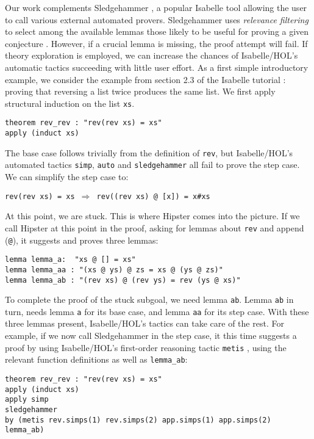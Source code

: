 Our work complements Sledgehammer \cite{sledgehammer}, a popular Isabelle tool allowing the user to call various external automated provers. Sledgehammer uses \emph{relevance filtering} to select among the available lemmas those likely to be useful for proving a given conjecture \cite{mash}. However, if a crucial lemma is missing, the proof attempt will fail. If theory exploration is employed, we can increase the chances of Isabelle/HOL's automatic tactics succeeding with little user effort. As a first simple introductory example, we consider the example from section 2.3 of the Isabelle tutorial \cite{isabelle}: proving that reversing a list twice produces the same list. We first apply structural induction on the list \texttt{xs}.
\begin{verbatim}
theorem rev_rev : "rev(rev xs) = xs"
apply (induct xs)
\end{verbatim}
The base case follows trivially from the definition of \texttt{rev},
but Isabelle/HOL's automated tactics \texttt{simp}, \texttt{auto} and
\texttt{sledgehammer} all fail to prove the step case. We can simplify the step case to:
\begin{center}
\texttt{rev(rev  xs) = xs $\Longrightarrow$ rev((rev xs) @ [x]) = x\#xs}
\end{center}
At this point, we are stuck.
This is where Hipster comes into the picture. If we call Hipster at
this point in the proof, asking for lemmas about \texttt{rev} and
append (\texttt{@}), it suggests and proves three lemmas:
\begin{verbatim}
lemma lemma_a:  "xs @ [] = xs"
lemma lemma_aa : "(xs @ ys) @ zs = xs @ (ys @ zs)"
lemma lemma_ab : "(rev xs) @ (rev ys) = rev (ys @ xs)"
\end{verbatim}

To complete the proof of the stuck subgoal, we need lemma \texttt{ab}. Lemma \texttt{ab} in turn, needs lemma \texttt{a} for its base case, and lemma \texttt{aa} for its step case. With these three lemmas present, Isabelle/HOL's tactics can take care of the rest. For example, if we now call Sledgehammer in the step case, it this time suggests a proof by using Isabelle/HOL's first-order reasoning tactic \texttt{metis} \cite{metis}, using the relevant function definitions as well as \texttt{lemma\_ab}:
\begin{small}
\begin{verbatim}
theorem rev_rev : "rev(rev xs) = xs"
apply (induct xs)
apply simp
sledgehammer
by (metis rev.simps(1) rev.simps(2) app.simps(1) app.simps(2) lemma_ab)
\end{verbatim}
\end{small}
 
